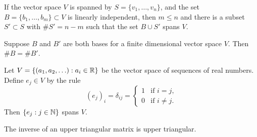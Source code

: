 \documentclass{homework}
\begin{document}
\begin{problem}\label{steinitz-exchange-lemma}If the vector space $V$ is spanned by $S = \{v_1,\ldots,v_n\}$,
  and the set $B = \{b_1,\ldots,b_m \} \subset V$ is linearly
  independent, then $m \leq n$ and there is a subset $S' \subset S$
  with $\# S' = n-m$ such that the set $B \cup S'$ spans $V$.
\end{problem}

\begin{problem}
  Suppose $B$ and $B'$ are both bases for a finite dimensional vector
  space $V$.  Then $\# B = \# B'$.
\end{problem}

\begin{problem}
  Let $V = \{ (a_1,a_2,\ldots) : a_i \in \mathbb{R} \}$ be the vector space of
  sequences of real numbers.  Define $e_j \in V$ by the rule
  \[
    (e_j)_i = \delta_{ij} = \begin{cases}
      1 & \mbox{if $i = j$,} \\
      0 & \mbox{if $i \neq j$.}
    \end{cases}
  \]
  Then $\{ e_j : j \in \mathbb{N} \}$ spans $V$.
\end{problem}

\begin{problem}
  The inverse of an upper triangular matrix is upper triangular.
\end{problem}
\end{document}
